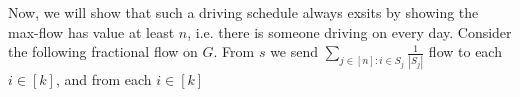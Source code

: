 \documentclass{article}
\begin{document}
Now, we will show that such a driving schedule always exsits by showing the max-flow has value at least $n$, i.e. there is someone driving on every day. Consider the following fractional flow on $G$. From $s$ we send $\sum_{j \in[n]:i \in S_j} \frac{1}{|S_j|}$ flow to each $i \in [k]$, and from each $i \in [k]$ 
\end{document}
